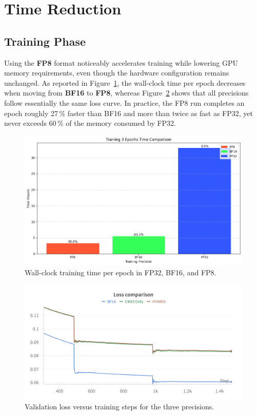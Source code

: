 \section{Time Reduction}\label{sec:time_reduction}

\subsection{Training Phase}
Using the \textbf{FP8} format noticeably accelerates training while lowering GPU memory requirements, even though the hardware configuration remains unchanged. As reported in Figure~\ref{fig:training_time_reduction}, the wall-clock time per epoch decreases when moving from \textbf{BF16} to \textbf{FP8}, whereas Figure~\ref{fig:losses_comparison} shows that all precisions follow essentially the same loss curve. In practice, the FP8 run completes an epoch roughly 27\,\% faster than BF16 and more than twice as fast as FP32, yet never exceeds 60\,\% of the memory consumed by FP32.

\begin{figure}[h]
    \centering
    \includegraphics[width=0.75\linewidth]{figures/c4/training_time_reduction.png}
    \caption{Wall-clock training time per epoch in FP32, BF16, and FP8.}
    \label{fig:training_time_reduction}
\end{figure}

\begin{figure}[h]
    \centering
    \includegraphics[width=1\linewidth]{figures/c4/losses_comparison.png}
    \caption{Validation loss versus training steps for the three precisions.}
    \label{fig:losses_comparison}
\end{figure}

